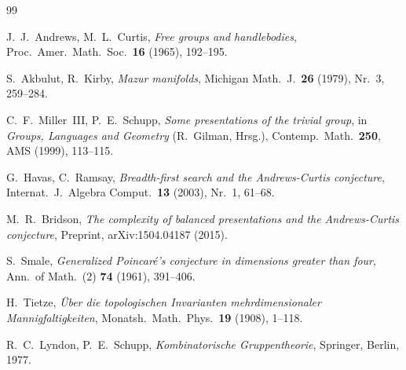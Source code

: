 \documentclass[12pt,a4paper]{amsart}
\theoremstyle{definition}
\theoremstyle{remark}
\begin{document}
\begin{thebibliography}{99}

J.~J.\ Andrews, M.~L.\ Curtis,
\textit{Free groups and handlebodies},
Proc.\ Amer.\ Math.\ Soc.\ \textbf{16} (1965), 192--195.

S.~Akbulut, R.~Kirby,
\textit{Mazur manifolds},
Michigan Math.\ J.\ \textbf{26} (1979), Nr.\ 3, 259--284.

C.~F.\ Miller~III, P.~E.\ Schupp,
\textit{Some presentations of the trivial group},
in \textit{Groups, Languages and Geometry} (R.~Gilman, Hrsg.),
Contemp.\ Math.\ \textbf{250}, AMS (1999), 113--115.

G.~Havas, C.~Ramsay,
\textit{Breadth-first search and the Andrews-Curtis conjecture},
Internat.\ J.\ Algebra Comput.\ \textbf{13} (2003), Nr.\ 1, 61--68.

M.~R.\ Bridson,
\textit{The complexity of balanced presentations and the Andrews-Curtis conjecture},
Preprint, arXiv:1504.04187 (2015).

S.~Smale,
\textit{Generalized Poincaré's conjecture in dimensions greater than four},
Ann.\ of Math.\ (2) \textbf{74} (1961), 391--406.

H.~Tietze,
\textit{Über die topologischen Invarianten mehrdimensionaler Mannigfaltigkeiten},
Monatsh.\ Math.\ Phys.\ \textbf{19} (1908), 1--118.

R.~C.\ Lyndon, P.~E.\ Schupp,
\textit{Kombinatorische Gruppentheorie},
Springer, Berlin, 1977.

\end{thebibliography}
\end{document}
